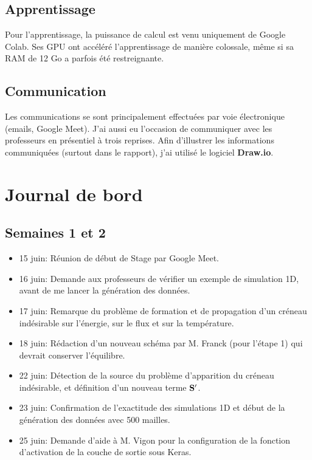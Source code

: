 \subsection{Apprentissage}
Pour l'apprentissage, la puissance de calcul est venu uniquement de Google Colab. Ses GPU ont accéléré l'apprentissage de manière colossale, même si sa RAM de 12 Go a parfois été restreignante.

\subsection{Communication}
Les communications se sont principalement effectuées par voie électronique (emails, Google Meet). J'ai aussi eu l'occasion de communiquer avec les professeurs en présentiel à trois reprises. Afin d'illustrer les informations communiquées (surtout dans le rapport), j'ai utilisé le logiciel \textbf{Draw.io}.


\section{Journal de bord}
\label{sec:Journal}

\subsection{Semaines 1 et 2}
\begin{itemize}
 \item 15 juin: Réunion de début de Stage par Google Meet.
 \item 16 juin: Demande aux professeurs de vérifier un exemple de simulation 1D, avant de me lancer la génération des données.
 \item 17 juin: Remarque du problème de formation et de propagation d'un créneau indésirable sur l'énergie, sur le flux et sur la température.
 \item 18 juin: Rédaction d'un nouveau schéma par M. Franck (pour l'étape 1) qui devrait conserver l'équilibre.
 \item 22 juin: Détection de la source du problème d'apparition du créneau indésirable, et définition d'un nouveau terme $\mathbf{S}^\prime$. 
 \item 23 juin: Confirmation de l'exactitude des simulations 1D et début de la génération des données avec 500 mailles.
 \item 25 juin: Demande d'aide à M. Vigon pour la configuration de la fonction d'activation de la couche de sortie sous Keras.
\end{itemize}


